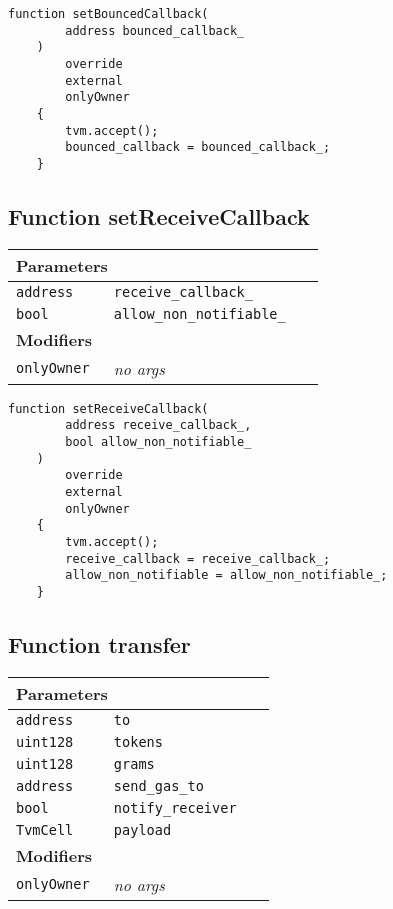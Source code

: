 \vspace{2cm}

\begin{lstlisting}[firstnumber=568]
    function setBouncedCallback(
        address bounced_callback_
    )
        override
        external
        onlyOwner
    {
        tvm.accept();
        bounced_callback = bounced_callback_;
    }
\end{lstlisting}

\subsection{Function setReceiveCallback}


\ifsoltables
\noindent\begin{tabular}{|l|l|p{5cm}|}\hline
\multicolumn{3}{|l|}{\bf Parameters}\\\hline
\tt address & \tt receive\_{}callback\_{} &\\\hline
\tt bool & \tt allow\_{}non\_{}notifiable\_{} &\\\hline
\multicolumn{3}{|l|}{\bf Modifiers}\\\hline
\tt onlyOwner & {\em no args} &\\\hline
\end{tabular}
\fi

\vspace{2cm}

\begin{lstlisting}[firstnumber=550]
    function setReceiveCallback(
        address receive_callback_,
        bool allow_non_notifiable_
    )
        override
        external
        onlyOwner
    {
        tvm.accept();
        receive_callback = receive_callback_;
        allow_non_notifiable = allow_non_notifiable_;
    }
\end{lstlisting}

\subsection{Function transfer}


\ifsoltables
\noindent\begin{tabular}{|l|l|p{5cm}|}\hline
\multicolumn{3}{|l|}{\bf Parameters}\\\hline
\tt address & \tt to &\\\hline
\tt uint128 & \tt tokens &\\\hline
\tt uint128 & \tt grams &\\\hline
\tt address & \tt send\_{}gas\_{}to &\\\hline
\tt bool & \tt notify\_{}receiver &\\\hline
\tt TvmCell & \tt payload &\\\hline
\multicolumn{3}{|l|}{\bf Modifiers}\\\hline
\tt onlyOwner & {\em no args} &\\\hline
\end{tabular}
\fi

